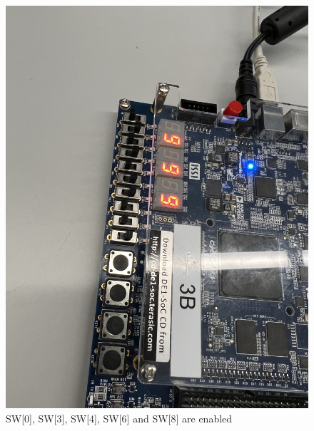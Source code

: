 \documentclass[
	letterpaper, %
	10pt, %
]{CSUniSchoolLabReport}
\begin{document}
\begin{figure}[H]
  \centering
  \includegraphics[width=.9\textwidth]{Figures/Three9.jpg}
  \caption{SW[0], SW[3], SW[4], SW[6] and SW[8] are enabled}
  \label{fig:18}
\end{figure}
\end{document}
